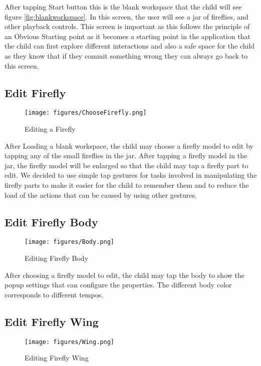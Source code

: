 After tapping Start button this is the blank workspace that the child will see figure \ref{fig:blankworkspace}. In this screen, the user will see a jar of fireflies, and other playback controls. This screen is important as this follows the principle of an Obvious Starting point as it becomes a starting point in the application that the child can first explore different interactions and also a safe space for the child as they know that if they commit something wrong they can always go back to this screen.

\subsection{Edit Firefly}

\begin{figure}[H]
    \centering
    \texttt{[image: figures/ChooseFirefly.png]}
    \caption{Editing a Firefly}
    \label{fig:editfirefly}
\end{figure}

After Loading a blank workspace, the child may choose a firefly model to edit by tapping any of the small fireflies in the jar. After tapping a firefly model in the jar, the firefly model will be enlarged so that the child may tap a firefly part to edit. We decided to use simple tap gestures for tasks involved in manipulating the firefly parts to make it easier for the child to remember them and to reduce the load of the actions that can be caused by using other gestures.  

\subsection{Edit Firefly Body}

\begin{figure}[H]
    \centering
    \texttt{[image: figures/Body.png]}
    \caption{Editing Firefly Body}
    \label{fig:tweakBody}
\end{figure}

After choosing a firefly model to edit, the child may tap the body to show the popup settings that can configure the properties. The different body color corresponds to different tempos.

\subsection{Edit Firefly Wing}

\begin{figure}[H]
    \centering
    \texttt{[image: figures/Wing.png]}
    \caption{Editing Firefly Wing}
    \label{fig:tweakWing}
\end{figure}

